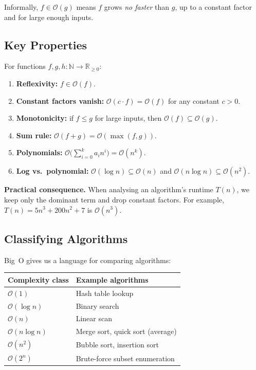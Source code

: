 \documentclass[11pt, a4paper]{article}
\theoremstyle{definition}
\theoremstyle{remark}
\begin{document}
Informally, $f\in\mathcal{O}(g)$ means $f$ grows \emph{no faster} than $g$, up to a constant
factor and for large enough inputs.

\subsection{Key Properties}

For functions $f,g,h\colon\mathbb{N}\to\mathbb{R}_{\geq 0}$:
\begin{enumerate}[itemsep=3pt]
  \item \textbf{Reflexivity:} $f\in\mathcal{O}(f)$.
  \item \textbf{Constant factors vanish:} $\mathcal{O}(c\cdot f)=\mathcal{O}(f)$ for any
        constant $c>0$.
  \item \textbf{Monotonicity:} if $f\leq g$ for large inputs, then
        $\mathcal{O}(f)\subseteq\mathcal{O}(g)$.
  \item \textbf{Sum rule:} $\mathcal{O}(f+g)=\mathcal{O}(\max(f,g))$.
  \item \textbf{Polynomials:} $\mathcal{O}\!\bigl(\sum_{i=0}^k a_i n^i\bigr)=\mathcal{O}(n^k)$.
  \item \textbf{Log vs.\ polynomial:} $\mathcal{O}(\log n)\subseteq\mathcal{O}(n)$ and
        $\mathcal{O}(n\log n)\subseteq\mathcal{O}(n^2)$.
\end{enumerate}

\begin{insightbox}
\textbf{Practical consequence.}  When analysing an algorithm's runtime $T(n)$, we keep only
the dominant term and drop constant factors.  For example, $T(n)=5n^3+200n^2+7$ is
$\mathcal{O}(n^3)$.
\end{insightbox}

\subsection{Classifying Algorithms}

Big~O gives us a language for comparing algorithms:

\begin{center}
\begin{tabular}{ll}
  \toprule
  Complexity class & Example algorithms \\
  \midrule
  $\mathcal{O}(1)$        & Hash table lookup \\
  $\mathcal{O}(\log n)$   & Binary search \\
  $\mathcal{O}(n)$        & Linear scan \\
  $\mathcal{O}(n\log n)$  & Merge sort, quick sort (average) \\
  $\mathcal{O}(n^2)$      & Bubble sort, insertion sort \\
  $\mathcal{O}(2^n)$      & Brute-force subset enumeration \\
  \bottomrule
\end{tabular}
\end{center}
\end{document}
